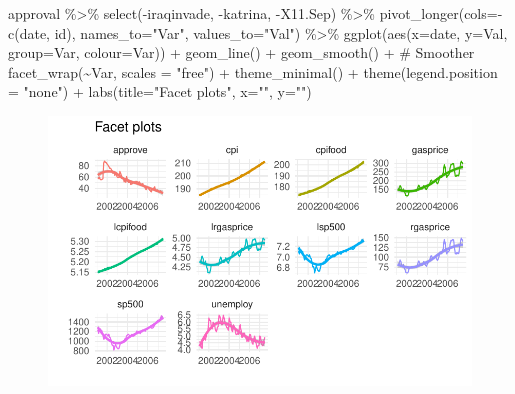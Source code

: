 \documentclass[
  letterpaper,
]{book}
\newenvironment{Shaded}{\begin{snugshade}}{\end{snugshade}}
\newcommand{\AttributeTok}[1]{\textcolor[rgb]{0.40,0.45,0.13}{#1}}
\newcommand{\CommentTok}[1]{\textcolor[rgb]{0.37,0.37,0.37}{#1}}
\newcommand{\FunctionTok}[1]{\textcolor[rgb]{0.28,0.35,0.67}{#1}}
\newcommand{\NormalTok}[1]{\textcolor[rgb]{0.00,0.23,0.31}{#1}}
\newcommand{\SpecialCharTok}[1]{\textcolor[rgb]{0.37,0.37,0.37}{#1}}
\newcommand{\StringTok}[1]{\textcolor[rgb]{0.13,0.47,0.30}{#1}}
\begin{document}
\begin{Shaded}
\begin{Highlighting}[]
\NormalTok{approval }\SpecialCharTok{\%\textgreater{}\%} 
  \FunctionTok{select}\NormalTok{(}\SpecialCharTok{{-}}\NormalTok{iraqinvade, }\SpecialCharTok{{-}}\NormalTok{katrina, }\SpecialCharTok{{-}}\NormalTok{X11.Sep) }\SpecialCharTok{\%\textgreater{}\%}
  \FunctionTok{pivot\_longer}\NormalTok{(}\AttributeTok{cols=}\SpecialCharTok{{-}}\FunctionTok{c}\NormalTok{(date, id), }\AttributeTok{names\_to=}\StringTok{"Var"}\NormalTok{, }\AttributeTok{values\_to=}\StringTok{"Val"}\NormalTok{) }\SpecialCharTok{\%\textgreater{}\%}
  \FunctionTok{ggplot}\NormalTok{(}\FunctionTok{aes}\NormalTok{(}\AttributeTok{x=}\NormalTok{date, }\AttributeTok{y=}\NormalTok{Val, }\AttributeTok{group=}\NormalTok{Var, }\AttributeTok{colour=}\NormalTok{Var)) }\SpecialCharTok{+}
  \FunctionTok{geom\_line}\NormalTok{() }\SpecialCharTok{+}
  \FunctionTok{geom\_smooth}\NormalTok{() }\SpecialCharTok{+} \CommentTok{\# Smoother}
  \FunctionTok{facet\_wrap}\NormalTok{(}\SpecialCharTok{\textasciitilde{}}\NormalTok{Var, }\AttributeTok{scales =} \StringTok{"free"}\NormalTok{) }\SpecialCharTok{+}
  \FunctionTok{theme\_minimal}\NormalTok{() }\SpecialCharTok{+} 
  \FunctionTok{theme}\NormalTok{(}\AttributeTok{legend.position =} \StringTok{"none"}\NormalTok{) }\SpecialCharTok{+}
  \FunctionTok{labs}\NormalTok{(}\AttributeTok{title=}\StringTok{"Facet plots"}\NormalTok{, }\AttributeTok{x=}\StringTok{""}\NormalTok{, }\AttributeTok{y=}\StringTok{""}\NormalTok{)}
\end{Highlighting}
\end{Shaded}

\begin{figure}[H]

{\centering \includegraphics{Appendix1_files/figure-pdf/unnamed-chunk-12-1.pdf}

}

\end{figure}
\end{document}
